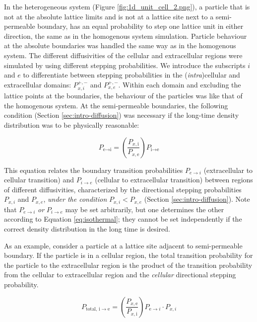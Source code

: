 	In the heterogeneous system (Figure \ref{fig:1d_unit_cell_2.png}), a particle that is not at the absolute lattice limits and is not at a lattice site next to a semi-permeable boundary, has an equal probability to step one lattice unit in either direction, the same as in the homogenous system simulation. Particle behaviour at the absolute boundaries was handled the same way as in the homogenous system. The different diffusivities of the cellular and extracellular regions were simulated by using different stepping probabilities. We introduce the subscripts $ i $ and $ e $ to differentiate between stepping probabilities in the (\textsl{intra})cellular and extracellular domains: $ P_{x,i}^{+,-} $ and $ P_{x,e}^{+,-} $. Within each domain and excluding the lattice points at the boundaries, the behaviour of the particles was like that of the homogenous system. At the semi-permeable boundaries, the following condition (Section \ref{sec:intro-diffusion}) was necessary if the long-time density distribution was to be physically reasonable:
	
	\begin{equation}
		\label{eq:isothermal}
		P_{\textrm{e}\rightarrow \textrm{i}} = \left( \dfrac{P_{x,\textrm{i}}}{P_{x,\textrm{e}}}\right)  P_{\textrm{i}\rightarrow \textrm{e}}
	\end{equation}
	
	This equation relates the boundary transition probabilities $ P_{e \rightarrow i} $ (extracellular to cellular transition) and $ P_{i \rightarrow e} $ (cellular to extracellular transition) between regions of different diffusivities, characterized by the directional stepping probabilities $ P_{x,i} $ and $ P_{x,e} $, \emph{under the condition} $ P_{x,i} < P_{x,e} $ (Section \ref{sec:intro-diffusion}). Note that $ P_{e \rightarrow i} $ \textsl{or} $ P_{i \rightarrow e} $ may be set arbitrarily, but one determines the other according to Equation \ref{eq:isothermal}; they cannot be set independently if the correct density distribution in the long time is desired. 
	
	As an example, consider a particle at a lattice site adjacent to semi-permeable boundary. If the particle is in a cellular region, the total transition probability for the particle to the extracellular region is the product of the transition probability from the cellular to extracellular region and the \textsl{cellular} directional stepping probability.
	
	\begin{equation}
		\label{eq:total_transition_prob}
		P_{\textrm{total},\, \textrm{i} \rightarrow \textrm{e}} = \left( \dfrac{P_{x,\textrm{e}}}{P_{x,\textrm{i}}}\right)  P_{\textrm{e}\rightarrow i} \cdot P_{x,i}
	\end{equation}
	
